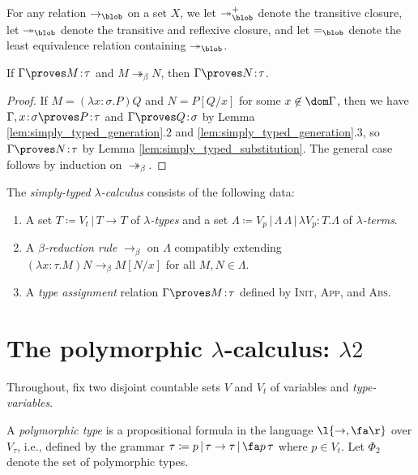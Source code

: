 \documentclass[reqno]{amsart}
\begin{document}
    \begin{notation}
        For any relation $\rightarrow_\blob$ on a set $X$, we let $\twoheadrightarrow_\blob^+$ denote the transitive closure, let $\twoheadrightarrow_\blob$ denote the transitive and reflexive closure, and let $=_\blob$ denote the least equivalence relation containing $\twoheadrightarrow_\blob$.
    \end{notation}

    \begin{theorem}\label{thm:simply_typed_subject_reduction}
        If $\Gamma\proves M\!:\!\tau$ and $M\twoheadrightarrow_\beta N$, then $\Gamma\proves N\!:\!\tau$.
    \end{theorem}
    \begin{proof}
        If $M=(\lambda x\!:\!\sigma.P)Q$ and $N=P[Q/x]$ for some $x\not\in\dom\Gamma$, then we have $\Gamma,x\!:\!\sigma\proves P\!:\!\tau$ and $\Gamma\proves Q\!:\!\sigma$ by Lemma \ref{lem:simply_typed_generation}.2 and \ref{lem:simply_typed_generation}.3, so $\Gamma\proves N\!:\!\tau$ by Lemma \ref{lem:simply_typed_substitution}. The general case follows by induction on $\twoheadrightarrow_\beta$.
    \end{proof}

    The \textit{simply-typed $\lambda$-calculus} consists of the following data:
    \begin{enumerate}
        \item A set $T\coloneqq V_t\,|\,T\rightarrow T$ of \textit{$\lambda$-types} and a set $\Lambda\coloneqq V_p\,|\,\Lambda\,\Lambda\,|\,\lambda V_p\!:\!T.\Lambda$ of \textit{$\lambda$-terms}.
        \item A \textit{$\beta$-reduction rule} $\rightarrow_\beta$ on $\Lambda$ compatibly extending $(\lambda x\!:\!\tau.M)N\rightarrow_\beta M[N/x]$ for all $M,N\in\Lambda$.
        \item A \textit{type assignment} relation $\Gamma\proves M\!:\!\tau$ defined by \textsc{Init}, \textsc{App}, and \textsc{Abs}.
    \end{enumerate}

    \section{The polymorphic $\lambda$-calculus: $\lambda2$}

    Throughout, fix two disjoint countable sets $V$ and $V_t$ of variables and \textit{type-variables}.

    \begin{definition}
        A \textit{polymorphic type} is a propositional formula in the language $\l\{\rightarrow,\fa\r\}$ over $V_\tau$, i.e., defined by the grammar $\tau\coloneqq p\,|\,\tau\rightarrow\tau\,|\,\fa p\,\tau$ where $p\in V_t$. Let $\Phi_2$ denote the set of polymorphic types.
    \end{definition}
\end{document}
